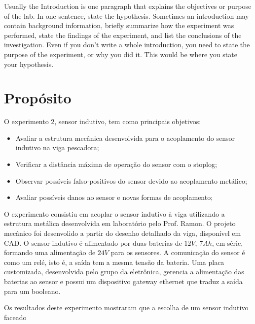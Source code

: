 
 
Usually the Introduction is one paragraph that explains the objectives or purpose of the lab. In one sentence, state the hypothesis. Sometimes an introduction may contain background information, briefly summarize how the experiment was performed, state the findings of the experiment, and list the conclusions of the investigation. Even if you don't write a whole introduction, you need to state the purpose of the experiment, or why you did it. This would be where you state your hypothesis.

\section{Propósito}
O experimento 2, sensor indutivo, tem como principais objetivos:
 \begin{itemize}
 \item Avaliar a estrutura mecânica desenvolvida para o acoplamento do sensor
 indutivo na viga pescadora;
 \item Verificar a distância máxima de operação do sensor com o stoplog;
 \item Observar possíveis falso-positivos do sensor devido ao acoplamento
 metálico;
 \item Avaliar possíveis danos ao sensor e novas formas de acoplamento;
 \end{itemize}
\label{proposito}
O experimento consistiu em acoplar o sensor indutivo à viga utilizando a
estrutura metálica desenvolvida em laboratório pelo Prof. Ramon. O projeto
mecânico foi desenvolido a partir do desenho detalhado da viga,
disponível em CAD.
O sensor indutivo é alimentado por duas baterias de $12V$, $7Ah$, em série, formando uma alimentação de $24V$ para
os sensores. A comunicação do sensor é como um relé, isto é, a saída tem a mesma
tensão da bateria. Uma placa customizada, desenvolvida pelo grupo da eletrônica,
gerencia a alimentação das baterias ao sensor e possui um
dispositivo gateway ethernet que traduz a saída para um booleano. 

Os resultados deste experimento mostraram que a escolha de um sensor indutivo
faceado
